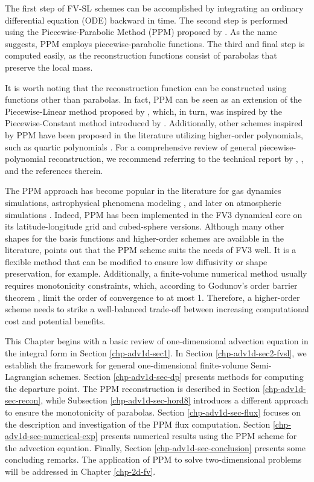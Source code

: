 The first step of FV-SL schemes can be accomplished by integrating an ordinary differential
equation (ODE) backward in time.
The second step is performed using the Piecewise-Parabolic Method (PPM) proposed by \citet{colella:1984}.
As the name suggests, PPM employs piecewise-parabolic functions.
The third and final step is computed easily, as the reconstruction functions consist of parabolas that preserve the local mass.

It is worth noting that the reconstruction function can be constructed using functions other than parabolas.
In fact, PPM can be seen as an
extension of the Piecewise-Linear method proposed by \citet{vanleer:1977}, which,
in turn, was inspired by the Piecewise-Constant method introduced by \citet{godunov:1959}. 
Additionally, other schemes inspired by PPM have been proposed in the literature utilizing
higher-order polynomials, such as quartic polynomials \citep{white:2008}. For a
comprehensive review of general piecewise-polynomial reconstruction, we recommend
referring to the technical report by \citet{engwirda:2016}, \citet{lauritzen:2011}, and the
references therein.

The PPM approach has become popular in the literature for gas dynamics simulations, astrophysical 
phenomena modeling \citep{woodward:1986}, and later on atmospheric simulations \citep{carpenter:1990}. 
Indeed, PPM has been implemented in the FV3 dynamical core on its latitude-longitude grid \citep{lin:2004}
and cubed-sphere \citep{putman:2007} versions.
Although many other shapes for the basis functions and higher-order schemes are available in the literature, 
\citet{harris:2021} points out that the PPM scheme suits the needs of FV3 well. It is a flexible method that
can be modified to ensure low diffusivity or shape preservation, for example.
Additionally, a finite-volume numerical method usually requires monotonicity constraints, which, according 
to Godunov's order barrier theorem \citep{wesseling:2001}, limit the order of convergence to at most 1. 
Therefore, a higher-order scheme needs to strike a well-balanced trade-off between increasing computational 
cost and potential benefits.

This Chapter begins with a basic review of one-dimensional advection equation in the integral form
in Section \ref{chp-adv1d-sec1}. In Section \ref{chp-adv1d-sec2-fvsl}, we establish the framework for general
one-dimensional finite-volume Semi-Lagrangian schemes. Section \ref{chp-adv1d-sec-dp} presents
methods for computing the departure point. The PPM reconstruction is described in Section \ref{chp-adv1d-sec-recon},
while Subsection \ref{chp-adv1d-sec-hord8} introduces a different approach to ensure the monotonicity of parabolas.
Section \ref{chp-adv1d-sec-flux} focuses on the description and investigation of the PPM flux computation.
Section \ref{chp-adv1d-sec-numerical-exp}
presents numerical results using the PPM scheme for the advection equation.
Finally, Section \ref{chp-adv1d-sec-conclusion} presents some concluding remarks.
The application of PPM to solve two-dimensional problems will be addressed in Chapter \ref{chp-2d-fv}.

